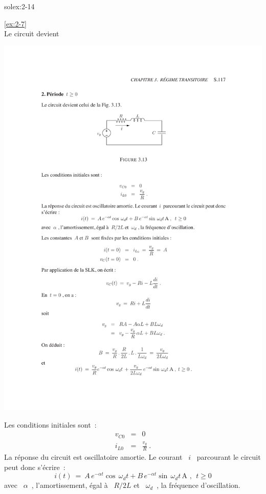\begin{exwithsol}{solex:2-14}
\begin{solexercise}{\ref{ex:2-7}}
\\
Le circuit devient
\begin{center}
	\includegraphics[width=\linewidth]{sol_exercices/ex3-7-2}
\end{center}
Les conditions initiales sont~:
\begin{eqnarray*}
	v_{C0} &=& 0\\
	i_{L0} &=& \frac{v_g}{R}~.
\end{eqnarray*}
La r\'eponse du circuit est oscillatoire amortie. Le courant \ $i$ \
parcourant le circuit peut donc s'\'ecrire~:
\[ i(t) \: = \: A \, e^{-\alpha t} \cos\, \omega_d t + 
B\, e^{-\alpha t} \sin \, \omega_d t\, \text{A~}, ~~t\geq 0 \]
avec \ $\alpha$~, l'amortissement, \'egal \`a \ $R/2L$
et \ $\omega_d$~, la fr\'equence d'oscillation.


\end{solexercise}
\end{exwithsol}
